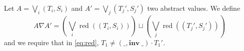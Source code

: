 \documentclass[runningheads]{llncs}
\newcommand{\inv}[1]{\mathbf{inv}\ \mathtt{#1}}
\DeclareMathOperator{\red}{red}
\begin{document}
\begin{definition}[Widening]
	Let $A = \bigvee_i (T_i, S_i)$ and $A' = \bigvee_j (T_j', S_j')$ two abstract values. We define 
	\[A \nabla A' = \left(\bigvee_i \red((T_i, S_i))\right) \sqcup \left(\bigvee_j \red((T_j', S_j')) \right)\]
	and we require that in \eqref{eq:red}, $T_1 \neq (\_, \inv{\_}) \cdot T_1'$.
\end{definition}






















%
%
\end{document}

